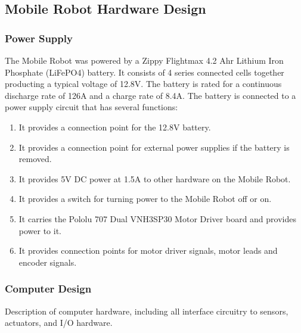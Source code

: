 \documentclass[11pt,a4paper]{article}
\begin{document}
  \subsection{Mobile Robot Hardware Design}
    \subsubsection{Power Supply}
      The Mobile Robot was powered by a Zippy Flightmax 4.2 Ahr Lithium Iron Phosphate (LiFePO4) battery. It consists of 4 series connected cells together producting a typical voltage of 12.8V. The battery is rated for a continuous discharge rate of 126A and a charge rate of 8.4A. The battery is connected to a power supply circuit that has several functions:
      \begin{enumerate}
        \item It provides a connection point for the 12.8V battery.
        \item It provides a connection point for external power supplies if the battery is removed.
        \item It provides 5V DC power at 1.5A to other hardware on the Mobile Robot.
        \item It provides a switch for turning power to the Mobile Robot off or on.
        \item It carries the Pololu 707 Dual VNH3SP30 Motor Driver board and provides power to it.
        \item It provides connection points for motor driver signals, motor leads and encoder signals.
      \end{enumerate}
    \subsubsection{Computer Design}
    Description of computer hardware, including all interface circuitry to sensors, actuators, and I/O hardware.
\end{document}
